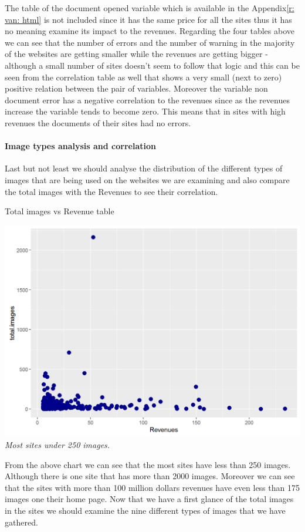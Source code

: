 \documentclass{article}
\begin{document}
The table of the document opened variable which is available in the Appendix\ref{r: van: html} is not included since it has the same price for all the sites thus it has no meaning examine its impact to the revenues. Regarding the four tables above we can see that the number of errors and the number of warning in the majority of the websites are getting smaller while the revenues are getting bigger - although a small number of sites doesn't seem to follow that logic and this can be seen from the correlation table as well that shows a very small (next to zero) positive relation between the pair of variables. Moreover the variable non document error has a negative correlation to the revenues since as the revenues increase the variable tends to become zero. This means that in sites with high revenues the documents of their sites had no errors.
\paragraph{Image types analysis and correlation}
Last but not least we should analyse the distribution of the different types of images that are being used on the websites we are examining and also compare the total images with the Revenues to see their correlation.
\begin{table}[H]
\centering
\caption{Total images vs Revenue table}
\begin{center}
\includegraphics[scale=0.5]{../R/photos/53_timg_rev.png}    \\
\textit{Most sites under 250 images.}
\end{center}
\end{table}
From the above chart we can see that the most sites have less than 250 images. Although there is one site that has more than 2000 images. Moreover we can see that the sites with more than 100 million dollars revenues have even less than 175 images one their home page. Now that we have a first glance of the total images in the sites we should examine the nine different types of images that we have gathered.
\end{document}
